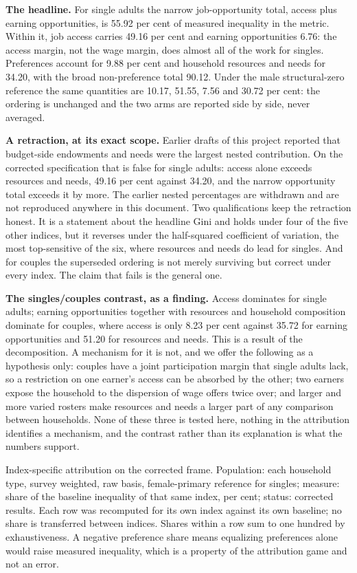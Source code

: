 \documentclass[11pt,a4paper]{article}
\begin{document}
\textbf{The headline.} For single adults the narrow job-opportunity total, access plus earning opportunities, is 55.92 per cent of measured inequality in the metric. Within it, job access carries 49.16 per cent and earning opportunities 6.76: the access margin, not the wage margin, does almost all of the work for singles. Preferences account for 9.88 per cent and household resources and needs for 34.20, with the broad non-preference total 90.12. Under the male structural-zero reference the same quantities are 10.17, 51.55, 7.56 and 30.72 per cent: the ordering is unchanged and the two arms are reported side by side, never averaged.

\textbf{A retraction, at its exact scope.} Earlier drafts of this project reported that budget-side endowments and needs were the largest nested contribution. On the corrected specification that is false for single adults: access alone exceeds resources and needs, 49.16 per cent against 34.20, and the narrow opportunity total exceeds it by more. The earlier nested percentages are withdrawn and are not reproduced anywhere in this document. Two qualifications keep the retraction honest. It is a statement about the headline Gini and holds under four of the five other indices, but it reverses under the half-squared coefficient of variation, the most top-sensitive of the six, where resources and needs do lead for singles. And for couples the superseded ordering is not merely surviving but correct under every index. The claim that fails is the general one.

\textbf{The singles/couples contrast, as a finding.} Access dominates for single adults; earning opportunities together with resources and household composition dominate for couples, where access is only 8.23 per cent against 35.72 for earning opportunities and 51.20 for resources and needs. This is a result of the decomposition. A mechanism for it is not, and we offer the following as a hypothesis only: couples have a joint participation margin that single adults lack, so a restriction on one earner's access can be absorbed by the other; two earners expose the household to the dispersion of wage offers twice over; and larger and more varied rosters make resources and needs a larger part of any comparison between households. None of these three is tested here, nothing in the attribution identifies a mechanism, and the contrast rather than its explanation is what the numbers support.

Index-specific attribution on the corrected frame. Population: each household type, survey weighted, raw basis, female-primary reference for singles; measure: share of the baseline inequality of that same index, per cent; status: corrected results. Each row was recomputed for its own index against its own baseline; no share is transferred between indices. Shares within a row sum to one hundred by exhaustiveness. A negative preference share means equalizing preferences alone would raise measured inequality, which is a property of the attribution game and not an error.
\end{document}
